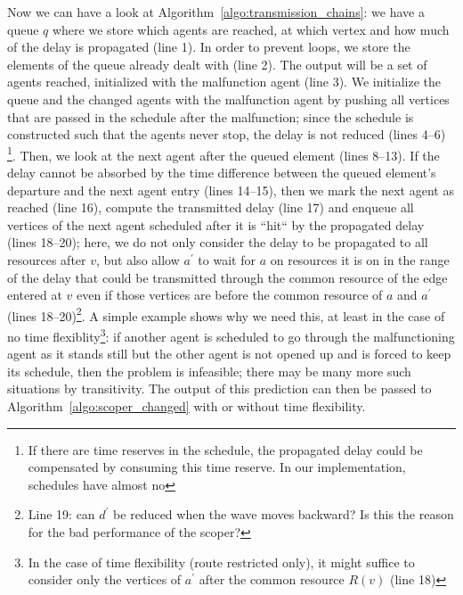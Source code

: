 \documentclass{article}
\begin{document}
Now we can have a look at Algorithm~\ref{algo:transmission_chains}: we have a queue $q$ where we store which agents are reached, at which vertex and how much of the delay is propagated (line 1). In order to prevent loops, we store the elements of the queue already dealt with (line 2).  The output will be a set of agents reached, initialized with the malfunction agent (line 3).
We initialize the queue and the changed agents with the malfunction agent by pushing all vertices that are passed in the schedule after the malfunction; since the schedule is constructed such that the agents never stop, the delay is not reduced (lines 4--6) \footnote{If there are time reserves in the schedule, the propagated delay could be compensated by consuming this time reserve. In our implementation, schedules have almost no }.
Then, we look at the next agent after the queued element (lines 8--13). If the delay cannot be absorbed by the time difference between the queued element's departure and the next agent entry (lines 14--15), then we mark the next agent as reached (line 16),
compute the transmitted delay (line 17)
and enqueue all vertices of the next agent scheduled after it is ``hit`` by the propagated delay (lines 18--20); here, we do not only consider the delay to be propagated to all resources after $v$, but also allow $a^\prime$ to wait for $a$ on resources it is on in the range of the delay that could be transmitted through the common resource of the edge entered at $v$ even if those vertices are before the common resource of $a$ and $a^\prime$ (lines 18--20)\footnote{Line 19: can $d^\prime$ be reduced when the wave moves backward? Is this the reason for the bad performance of the scoper?}. A simple example shows why we need this, at least in the case of no time flexiblity\footnote{In the case of time flexibility (route restricted only), it might suffice to consider only the vertices of $a^\prime$ after the common resource $R(v)$ (line 18)}: if another agent is scheduled to go through the malfunctioning agent as it stands still but the other agent is not opened up and is forced to keep its schedule, then the problem is infeasible; there may be many more such situations by transitivity. The output of this prediction can then be passed to Algorithm~\ref{algo:scoper_changed} with or without time flexibility.
\end{document}
